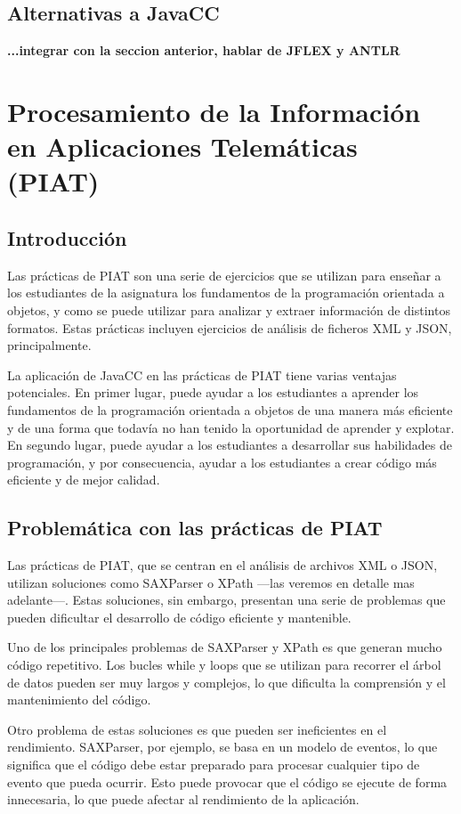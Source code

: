 \subsection{Alternativas a JavaCC}

\textbf{...integrar con la seccion anterior, hablar de JFLEX y ANTLR}

\section{Procesamiento de la Información en Aplicaciones Telemáticas (PIAT)}
\subsection{Introducción}
\noindent Las prácticas de PIAT son una serie de ejercicios que se utilizan para enseñar a los estudiantes de la asignatura los fundamentos de la programación orientada a objetos, y como se puede utilizar para analizar y extraer información de distintos formatos. Estas prácticas incluyen ejercicios de análisis de ficheros XML y JSON, principalmente.

La aplicación de JavaCC en las prácticas de PIAT tiene varias ventajas potenciales. En primer lugar, puede ayudar a los estudiantes a aprender los fundamentos de la programación orientada a objetos de una manera más eficiente y de una forma que todavía no han tenido la oportunidad de aprender y explotar. En segundo lugar, puede ayudar a los estudiantes a desarrollar sus habilidades de programación, y por consecuencia, ayudar a los estudiantes a crear código más eficiente y de mejor calidad.
\subsection{Problemática con las prácticas de PIAT}

\noindent Las prácticas de PIAT, que se centran en el análisis de archivos XML o JSON,  utilizan soluciones como SAXParser o XPath ---las veremos en detalle mas adelante---. Estas soluciones, sin embargo, presentan una serie de problemas que pueden dificultar el desarrollo de código eficiente y mantenible.

Uno de los principales problemas de SAXParser y XPath es que generan mucho código repetitivo. Los bucles while y loops que se utilizan para recorrer el árbol de datos pueden ser muy largos y complejos, lo que dificulta la comprensión y el mantenimiento del código.

Otro problema de estas soluciones es que pueden ser ineficientes en el rendimiento. SAXParser, por ejemplo, se basa en un modelo de eventos, lo que significa que el código debe estar preparado para procesar cualquier tipo de evento que pueda ocurrir. Esto puede provocar que el código se ejecute de forma innecesaria, lo que puede afectar al rendimiento de la aplicación.

